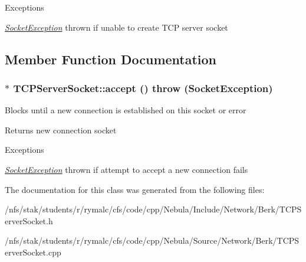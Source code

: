 \begin{DoxyExceptions}{Exceptions}
\item[{\em \hyperlink{classSocketException}{SocketException}}]thrown if unable to create TCP server socket \end{DoxyExceptions}


\subsection{Member Function Documentation}
\hypertarget{classTCPServerSocket_a1d161137e1b069de7a7bfc14d3f8212c}{
\subsubsection[{accept}]{ $\ast$ TCPServerSocket::accept ()  throw ({\bf SocketException})}}
\label{classTCPServerSocket_a1d161137e1b069de7a7bfc14d3f8212c}
Blocks until a new connection is established on this socket or error \begin{DoxyReturn}{Returns}
new connection socket 
\end{DoxyReturn}

\begin{DoxyExceptions}{Exceptions}
\item[{\em \hyperlink{classSocketException}{SocketException}}]thrown if attempt to accept a new connection fails \end{DoxyExceptions}


The documentation for this class was generated from the following files:\begin{DoxyCompactItemize}
\item 
/nfs/stak/students/r/rymalc/cfs/code/cpp/Nebula/Include/Network/Berk/TCPServerSocket.h\item 
/nfs/stak/students/r/rymalc/cfs/code/cpp/Nebula/Source/Network/Berk/TCPServerSocket.cpp\end{DoxyCompactItemize}
